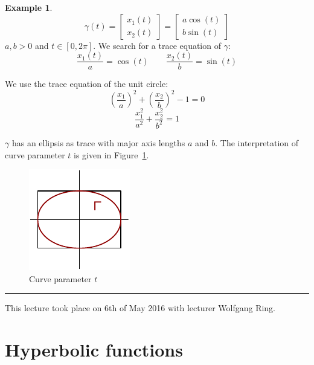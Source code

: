 \documentclass[a4paper,landscape,twocolumn]{article}
\theoremstyle{definition}
\newtheorem{ex}{Example}
\newcommand\meta[3]{\hrule{} This #1 took place on #2 with lecturer #3.\par}
\begin{document}
\begin{ex}
  \[
    \gamma(t)
    = \begin{bmatrix} x_1(t) \\ x_2(t) \end{bmatrix}
    = \begin{bmatrix} a\cos(t) \\ b\sin(t) \end{bmatrix}
  \]
  $a, b > 0$ and $t \in [0,2\pi]$.
  We search for a trace equation of $\gamma$:
  \[
    \frac{x_1(t)}{a} = \cos(t)
    \qquad
    \frac{x_2(t)}{b} = \sin(t)
  \]

  We use the trace equation of the unit circle:
  \[ \left(\frac{x_1}{a}\right)^2 + \left(\frac{x_2}{b}\right)^2 - 1 = 0 \]
  \[ \frac{x_1^2}{a^2} + \frac{x_2^2}{b^2} = 1 \]

  $\gamma$ has an ellipsis as trace with major axis lengths $a$ and $b$.
  The interpretation of curve parameter $t$ is given in Figure~\ref{img:curpar}.

  \begin{figure}[!h]
    \begin{center}
      \includegraphics{img/curve_parameter.pdf}
      \caption{Curve parameter $t$}
      \label{img:curpar}
    \end{center}
  \end{figure}
\end{ex}

\meta{lecture}{6th of May 2016}{Wolfgang Ring}

\section{Hyperbolic functions}
\end{document}
